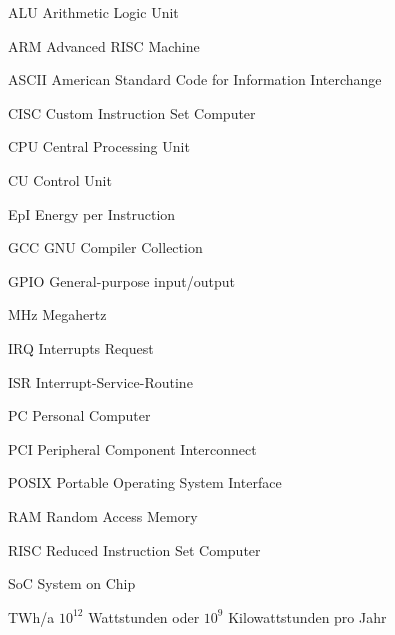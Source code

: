 \begin{abkuerzungen}[MUSTER] %
\item[ALU] Arithmetic Logic Unit
\item[ARM] Advanced RISC Machine
\item[ASCII] American Standard Code for Information Interchange
\item[CISC] Custom Instruction Set Computer
\item[CPU] Central Processing Unit
\item[CU] Control Unit
\item[EpI] Energy per Instruction
\item[GCC] GNU Compiler Collection
\item[GPIO] General-purpose input/output
\item[MHz] Megahertz
\item[IRQ] Interrupts Request
\item[ISR] Interrupt-Service-Routine
\item[PC] Personal Computer
\item[PCI] Peripheral Component Interconnect
\item[POSIX] Portable Operating System Interface
\item[RAM] Random Access Memory
\item[RISC] Reduced Instruction Set Computer
\item[SoC] System on Chip
\item[TWh/a] $10^{12}$ Wattstunden oder $10^{9}$ Kilowattstunden pro Jahr


\end{abkuerzungen}
